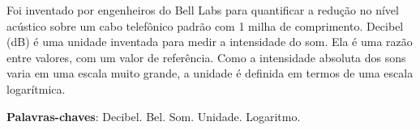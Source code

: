 \begin{resumoumacoluna}

        Foi inventado por engenheiros do Bell Labs para quantificar a redução no nível
    acústico sobre um cabo telefônico padrão com 1 milha de comprimento. Decibel (dB) é uma unidade inventada para medir a intensidade do som. Ela é uma razão entre valores, com um valor de referência. Como a
    intensidade absoluta dos sons varia em uma escala muito grande, a unidade é definida em termos de
    uma escala logarítmica.

 \vspace{\onelineskip}
 
 \noindent
 \textbf{Palavras-chaves}: Decibel. Bel. Som. Unidade. Logaritmo.
\end{resumoumacoluna}
